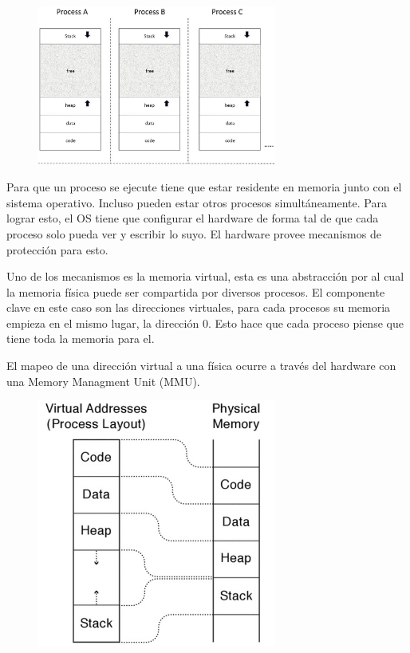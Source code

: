 \documentclass[titlepage,a4paper]{article}
\begin{document}
\begin{figure}[!htb]
    \centering
    \includegraphics[width=0.7\textwidth]{ImagenesApunte/procesosMemoria.png}
\end{figure}

Para que un proceso se ejecute tiene que estar residente en memoria junto con el sistema operativo. Incluso pueden estar otros procesos simultáneamente. Para lograr esto, el OS tiene que configurar el hardware de forma tal de que cada proceso solo pueda ver y escribir lo suyo. El hardware provee mecanismos de protección para esto.

Uno de los mecanismos es la memoria virtual, esta es una abstracción por al cual la memoria física puede ser compartida por diversos procesos. El componente clave en este caso son las direcciones virtuales, para cada procesos su memoria empieza en el mismo lugar, la dirección 0. Esto hace que cada proceso piense que tiene toda la memoria para el.

El mapeo de una dirección virtual a una física ocurre a través del hardware con una Memory Managment Unit (MMU).

\begin{figure}[!htb]
    \centering
    \includegraphics[width=0.7\textwidth]{ImagenesApunte/virtualizacionMemoria.jpg}
\end{figure}
\end{document}
